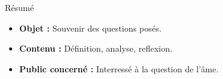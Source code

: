 \begin{center}
\Large
Résumé
\normalsize
\end{center}
\vspace{3cm}
\begin{itemize}[leftmargin=1cm, label=, itemsep=21pt]
\item {\bf Objet : } Souvenir des questions posés.
\item {\bf Contenu : } Définition, analyse, reflexion.
\item {\bf Public concerné : } Interressé à la question de l'âme.
\end{itemize}

\vspace{3cm}



\vspace{3cm}

